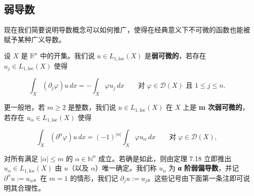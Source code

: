 \subsection*{弱导数}

现在我们简要说明导数概念可以如何推广，使得在经典意义下不可微的函数也能被赋予某种广义导数。

设 $ X $ 是 $ \mathbb{R}^n $ 中的开集。我们说 $ u \in L_{1,\mathrm{loc}}(X) $ 是\textbf{弱可微的}，若存在 $ u_j \in L_{1,\mathrm{loc}}(X) $ 使得

\begin{equation}
\int_X (\partial_j \varphi)u\, dx = -\int_X \varphi u_j\, dx \qquad \text{对 } \varphi \in \mathcal{D}(X) \text{ 且 } 1 \le j \le n .\tag{7.18}
\end{equation}

更一般地，若 $ m \ge 2 $ 是整数，我们说 $ u \in L_{1,\mathrm{loc}}(X) $ 在 $ X $ 上是 \textbf{m 次弱可微的}，若存在 $ u_\alpha \in L_{1,\mathrm{loc}}(X) $ 使得

\begin{equation}
\int_X (\partial^{\alpha}\varphi)u\, dx = (-1)^{|\alpha|} \int_X \varphi u_\alpha\, dx \qquad \text{对 } \varphi \in \mathcal{D}(X) ,\tag{7.19}
\end{equation}

对所有满足 $ |\alpha| \le m $ 的 $ \alpha \in \mathbb{N}^n $ 成立。若确是如此，则由定理 7.18 立即推出 $ u_\alpha \in L_{1,\mathrm{loc}}(X) $ 由 $ u $（以及 $ \alpha $）唯一确定。我们称 $ u_\alpha $ 为 \textbf{α 阶弱偏导数}，并记 $ \partial^{\alpha} u := u_\alpha $。在 $ m = 1 $ 的情形，我们记 $ \partial_j u := u_j $。这些记号由下面第一条注即可说明其合理性。

